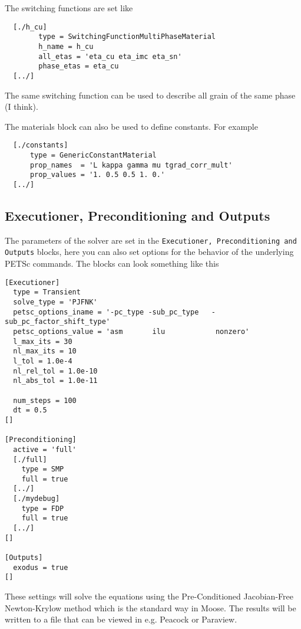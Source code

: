 \documentclass[12pt,a4paper]{article}
\begin{document}
The switching functions are set like
\begin{verbatim}
  [./h_cu]
        type = SwitchingFunctionMultiPhaseMaterial
        h_name = h_cu
        all_etas = 'eta_cu eta_imc eta_sn'
        phase_etas = eta_cu
  [../]
\end{verbatim}
The same switching function can be used to describe all grain of the same phase (I think).

The materials block can also be used to define constants. For example
\begin{verbatim}
  [./constants]
      type = GenericConstantMaterial
      prop_names  = 'L kappa gamma mu tgrad_corr_mult'
      prop_values = '1. 0.5 0.5 1. 0.'
  [../]
\end{verbatim}
\subsection{Executioner, Preconditioning and Outputs}
The parameters of the solver are set in the \texttt{Executioner, Preconditioning and Outputs} blocks, here you can also set options for the behavior of the underlying PETSc commands.
The blocks can look something like this
\begin{verbatim}
[Executioner]
  type = Transient
  solve_type = 'PJFNK'
  petsc_options_iname = '-pc_type -sub_pc_type   -sub_pc_factor_shift_type'
  petsc_options_value = 'asm       ilu            nonzero'
  l_max_its = 30
  nl_max_its = 10
  l_tol = 1.0e-4
  nl_rel_tol = 1.0e-10
  nl_abs_tol = 1.0e-11

  num_steps = 100
  dt = 0.5
[]

[Preconditioning]
  active = 'full'
  [./full]
    type = SMP
    full = true
  [../]
  [./mydebug]
    type = FDP
    full = true
  [../]
[]

[Outputs]
  exodus = true
[]
\end{verbatim}
These settings will solve the equations using the Pre-Conditioned Jacobian-Free Newton-Krylow method which is the standard way in Moose.
The results will be written to a file that can be viewed in e.g. Peacock or Paraview.



\end{document}
